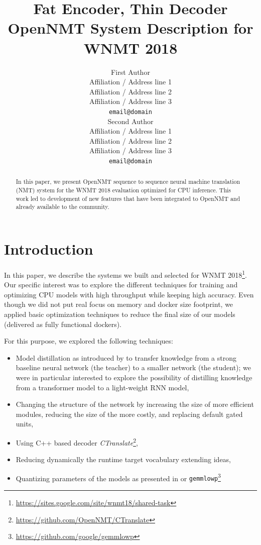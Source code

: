 \documentclass[11pt,a4paper]{article}
\title{Fat Encoder, Thin Decoder \protect\\ OpenNMT System Description for WNMT 2018}
\author{First Author \\
  Affiliation / Address line 1 \\
  Affiliation / Address line 2 \\
  Affiliation / Address line 3 \\
  {\tt email@domain} \\\And
  Second Author \\
  Affiliation / Address line 1 \\
  Affiliation / Address line 2 \\
  Affiliation / Address line 3 \\
  {\tt email@domain} \\}
\date{}
\begin{document}
\maketitle
\begin{abstract}
In this paper, we present OpenNMT sequence to sequence neural machine translation (NMT) system for the WNMT 2018 evaluation optimized for CPU inference. This work led to development of new features that have been integrated to OpenNMT and already available to the community.

\end{abstract}

\section{Introduction}
In this paper, we describe the systems we built and selected for WNMT 2018\footnote{\url{https://sites.google.com/site/wnmt18/shared-task}}. Our specific interest was to explore the different techniques for training and optimizing CPU models with high throughput while keeping high accuracy. Even though we did not put real focus on memory and docker size footprint, we applied basic optimization techniques to reduce the final size of our models (delivered as fully functional dockers).

For this purpose, we explored the following techniques:
\begin{itemize}
\item Model distillation as introduced by  to transfer knowledge from a strong baseline neural network (the teacher) to a smaller network (the student); we were in particular interested to explore the possibility of distilling knowledge from a transformer model \cite{vaswani2017attention} to a light-weight RNN model,
\item Changing the structure of the network by increasing the size of more efficient modules, reducing the size of the more costly, and replacing default gated units,
\item Using C++ based decoder \textit{CTranslate}\footnote{\url{https://github.com/OpenNMT/CTranslate}},
\item Reducing dynamically the runtime target vocabulary extending \cite{shi2017speeding} ideas,
\item Quantizing parameters of the models as presented in  or {\tt gemmlowp}\footnote{\url{https://github.com/google/gemmlowp}}
\end{itemize}
\end{document}
